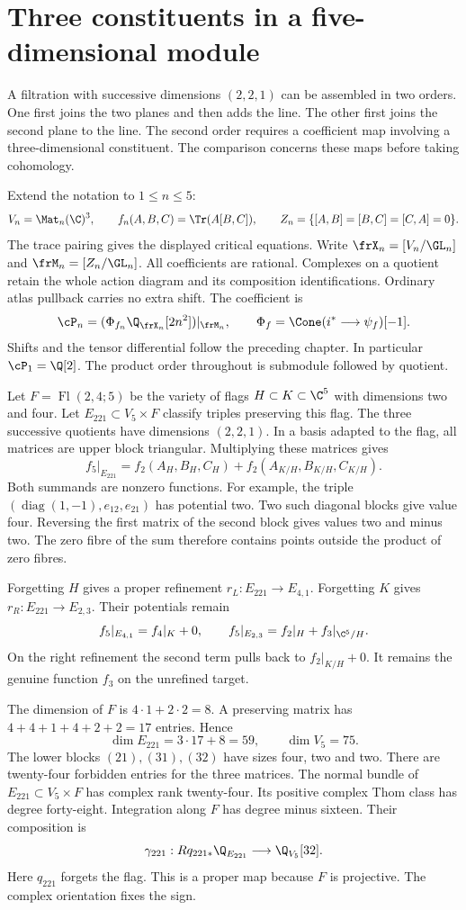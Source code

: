 \section{Three constituents in a five-dimensional module}
\label{fl221:sec:geometry}

A filtration with successive dimensions $(2,2,1)$ can be assembled
in two orders. One first joins the two planes and then adds the line.
The other first joins the second plane to the line. The second order
requires a coefficient map involving a three-dimensional constituent.
The comparison concerns these maps before taking cohomology.

Extend the notation to $1\le n\le5$:
\[
 V_n=\Mat_n(\C)^3,\qquad f_n(A,B,C)=\Tr(A[B,C]),\qquad
 Z_n=\{[A,B]=[B,C]=[C,A]=0\}.
\]
The trace pairing gives the displayed critical equations. Write
$\frX_n=[V_n/\GL_n]$ and $\frM_n=[Z_n/\GL_n]$.
All coefficients are rational. Complexes on a quotient retain the
whole action diagram and its composition identifications. Ordinary
atlas pullback carries no extra shift. The coefficient is
\[
 \cP_n=(\Phi_{f_n}\Q_{\frX_n}[2n^2])|_{\frM_n},
 \qquad \Phi_f=\Cone(i^*\longrightarrow\psi_f)[-1].
\]
Shifts and the tensor differential follow the preceding chapter.
In particular $\cP_1=\Q[2]$. The product order throughout is
submodule followed by quotient.

Let $F=\operatorname{Fl}(2,4;5)$ be the variety of flags
$H\subset K\subset\C^5$ with dimensions two and four. Let
$E_{221}\subset V_5\times F$ classify triples preserving this flag.
The three successive quotients have dimensions $(2,2,1)$.
In a basis adapted to the flag, all matrices are upper block triangular.
Multiplying these matrices gives
\[
 f_5|_{E_{221}}=f_2(A_H,B_H,C_H)
                  +f_2(A_{K/H},B_{K/H},C_{K/H}).
\]
Both summands are nonzero functions. For example, the triple
$(\operatorname{diag}(1,-1),e_{12},e_{21})$ has potential two.
Two such diagonal blocks give value four. Reversing the first
matrix of the second block gives values two and minus two.
The zero fibre of the sum therefore contains points outside the
product of zero fibres.

Forgetting $H$ gives a proper refinement
$r_L:E_{221}\to E_{4,1}$. Forgetting $K$ gives
$r_R:E_{221}\to E_{2,3}$. Their potentials remain
\[
 f_5|_{E_{4,1}}=f_4|_K+0,\qquad
 f_5|_{E_{2,3}}=f_2|_H+f_3|_{\C^5/H}.
\]
On the right refinement the second term pulls back to
$f_2|_{K/H}+0$. It remains the genuine function $f_3$ on the
unrefined target.

The dimension of $F$ is $4\cdot1+2\cdot2=8$.
A preserving matrix has $4+4+1+4+2+2=17$ entries. Hence
\[
 \dim E_{221}=3\cdot17+8=59,\qquad \dim V_5=75.
\]
The lower blocks $(21),(31),(32)$ have sizes four, two and two.
There are twenty-four forbidden entries for the three matrices.
The normal bundle of $E_{221}\subset V_5\times F$ has complex
rank twenty-four. Its positive complex Thom class has degree
forty-eight. Integration along $F$ has degree minus sixteen.
Their composition is
\[
 \gamma_{221}:Rq_{221*}\Q_{E_{221}}\longrightarrow\Q_{V_5}[32].
\]
Here $q_{221}$ forgets the flag. This is a proper map because $F$
is projective. The complex orientation fixes the sign.

